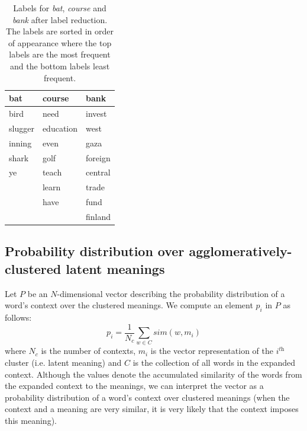 \documentclass[11pt]{article}
\begin{document}
\begin{table}
\center
    \begin{tabular}{lll}
    bat     & course    & bank    \\ \hline
    bird    & need      & invest  \\
    slugger & education & west    \\
    inning  & even      & gaza    \\
    shark   & golf      & foreign \\
    ye      & teach     & central \\
    ~       & learn     & trade   \\
    ~       & have      & fund    \\
    ~       & ~         & finland \\
    \end{tabular}
    \caption{Labels for \textit{bat}, \textit{course} and \textit{bank} after label reduction. The labels are sorted in order of appearance where the top labels are the most frequent and the bottom labels least frequent. }
    \label{labelreduction}
\end{table}

\subsection{Probability distribution over agglomeratively-clustered latent meanings}
Let $P$ be an $N$-dimensional vector describing the probability distribution of a word's context over the clustered meanings. We compute an element $p_i$ in $P$ as follows:
\begin{equation}\label{pa}p_i = \frac{1}{N_c}\sum\limits_{w\in C}sim(w, m_i)\end{equation}
where $N_c$ is the number of contexts, $m_i$ is the vector representation of the $i^{\textit{th}}$ cluster (i.e. latent meaning) and $C$ is the collection of all words in the expanded context. 
Although the values denote the accumulated similarity of the words from the expanded context to the meanings, we can interpret the vector as a probability distribution of a word's context over clustered meanings (when the context and a meaning are very similar, it is very likely that the context imposes this meaning). 
\end{document}
